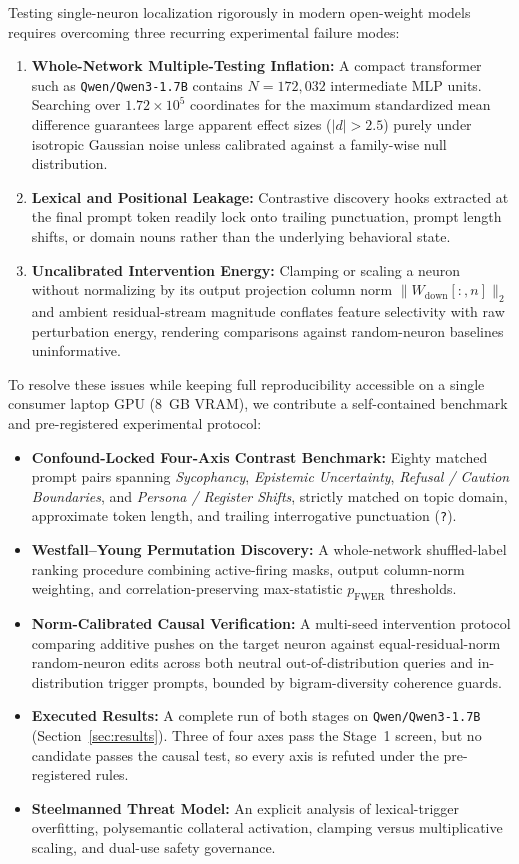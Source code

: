 \documentclass[11pt, a4paper]{article}
\begin{document}
Testing single-neuron localization rigorously in modern open-weight models requires overcoming three recurring experimental failure modes:
\begin{enumerate}[leftmargin=1.5em]
    \item \textbf{Whole-Network Multiple-Testing Inflation:} A compact transformer such as \texttt{Qwen/\allowbreak{}Qwen3-1.7B} \cite{yang2025qwen3} contains $N = 172{,}032$ intermediate MLP units. Searching over $1.72 \times 10^5$ coordinates for the maximum standardized mean difference guarantees large apparent effect sizes ($|d| > 2.5$) purely under isotropic Gaussian noise unless calibrated against a family-wise null distribution.
    \item \textbf{Lexical and Positional Leakage:} Contrastive discovery hooks extracted at the final prompt token readily lock onto trailing punctuation, prompt length shifts, or domain nouns rather than the underlying behavioral state.
    \item \textbf{Uncalibrated Intervention Energy:} Clamping or scaling a neuron without normalizing by its output projection column norm $\|W_{\mathrm{down}}[:, n]\|_2$ and ambient residual-stream magnitude conflates feature selectivity with raw perturbation energy, rendering comparisons against random-neuron baselines uninformative.
\end{enumerate}

To resolve these issues while keeping full reproducibility accessible on a single consumer laptop GPU (8~GB VRAM), we contribute a self-contained benchmark and pre-registered experimental protocol:
\begin{itemize}[leftmargin=1.5em]
    \item \textbf{Confound-Locked Four-Axis Contrast Benchmark:} Eighty matched prompt pairs spanning \emph{Sycophancy}, \emph{Epistemic Uncertainty}, \emph{Refusal / Caution Boundaries}, and \emph{Persona / Register Shifts}, strictly matched on topic domain, approximate token length, and trailing interrogative punctuation (\texttt{?}).
    \item \textbf{Westfall--Young Permutation Discovery:} A whole-network shuffled-label ranking procedure combining active-firing masks, output column-norm weighting, and correlation-preserving max-statistic $p_{\mathrm{FWER}}$ thresholds.
    \item \textbf{Norm-Calibrated Causal Verification:} A multi-seed intervention protocol comparing additive pushes on the target neuron against equal-residual-norm random-neuron edits across both neutral out-of-distribution queries and in-distribution trigger prompts, bounded by bigram-diversity coherence guards.
    \item \textbf{Executed Results:} A complete run of both stages on \texttt{Qwen/\allowbreak{}Qwen3-1.7B} (Section~\ref{sec:results}). Three of four axes pass the Stage~1 screen, but no candidate passes the causal test, so every axis is refuted under the pre-registered rules.
    \item \textbf{Steelmanned Threat Model:} An explicit analysis of lexical-trigger overfitting, polysemantic collateral activation, clamping versus multiplicative scaling, and dual-use safety governance.
\end{itemize}
\end{document}
